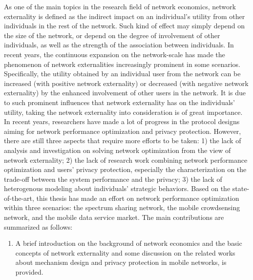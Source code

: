 \begin{englishabstract}
	As one of the main topics in the research field of network economics, network externality is defined as the indirect impact on an individual's utility from other individuals in the rest of the network. Such kind of effect may simply depend on the size of the network, or depend on the degree of involvement of other individuals, as well as the strength of the association between individuals. In recent years, the continuous expansion on the network-scale has made the phenomenon of network externalities increasingly prominent in some scenarios. Specifically, the utility obtained by an individual user from the network can be increased (with positive network externality) or decreased (with negative network externality) by the enhanced involvement of other users in the network. It is due to such prominent influences that network externality has on the individuals' utility, taking the network externality into consideration is of great importance. 
In recent years, researchers have made a lot of progress in the protocol designs aiming for network performance optimization and privacy protection. However, there are still three aspects that require more efforts to be taken: 1) the lack of analysis and investigation on solving network optimization from the view of network externality; 2) the lack of research work combining network performance optimization and users' privacy protection, especially the characterization on the trade-off between the system performance and the privacy; 3) the lack of heterogenous modeling about individuals' strategic behaviors. Based on the state-of-the-art, this thesis has made an effort on network performance optimization within three scenarios: the spectrum sharing network, the mobile crowdsensing network, and the mobile data service market. The main contributions are summarized as follows: 
	\begin{enumerate}
		\item A brief introduction on the background of network economics and the basic concepts of network externality and some discussion on the related works about mechanism design and privacy protection in mobile networks, is provided.

\end{enumerate}
\end{englishabstract}
